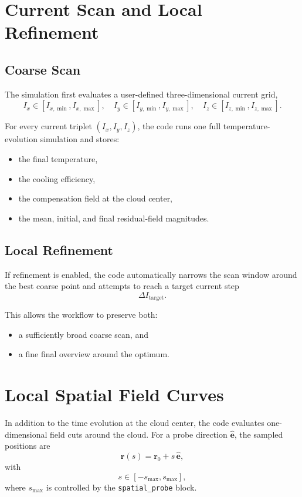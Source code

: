 \documentclass[12pt,a4paper]{article}
\begin{document}
\section{Current Scan and Local Refinement}

\subsection{Coarse Scan}

The simulation first evaluates a user-defined three-dimensional current grid,
\begin{equation}
  I_x \in [I_{x,\min}, I_{x,\max}],
  \quad
  I_y \in [I_{y,\min}, I_{y,\max}],
  \quad
  I_z \in [I_{z,\min}, I_{z,\max}].
\end{equation}

For every current triplet $(I_x,I_y,I_z)$, the code runs one full temperature-evolution simulation and stores:
\begin{itemize}
  \item the final temperature,
  \item the cooling efficiency,
  \item the compensation field at the cloud center,
  \item the mean, initial, and final residual-field magnitudes.
\end{itemize}

\subsection{Local Refinement}

If refinement is enabled, the code automatically narrows the scan window around the best coarse point and attempts to reach a target current step
\begin{equation}
  \Delta I_{\mathrm{target}}.
\end{equation}

This allows the workflow to preserve both:
\begin{itemize}
  \item a sufficiently broad coarse scan, and
  \item a fine final overview around the optimum.
\end{itemize}

\section{Local Spatial Field Curves}

In addition to the time evolution at the cloud center, the code evaluates one-dimensional field cuts around the cloud. For a probe direction $\hat{\bm{e}}$, the sampled positions are
\begin{equation}
  \bm{r}(s) = \bm{r}_0 + s\,\hat{\bm{e}},
\end{equation}
with
\begin{equation}
  s \in [-s_{\max}, s_{\max}],
\end{equation}
where $s_{\max}$ is controlled by the \texttt{spatial\_probe} block.
\end{document}
